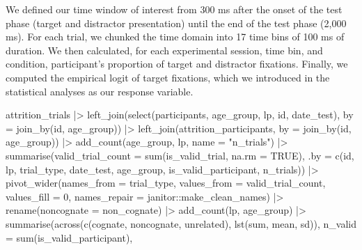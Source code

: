 \documentclass[
  letterpaper,
  DIV=11,
  numbers=noendperiod]{scrartcl}
\newenvironment{Shaded}{\begin{snugshade}}{\end{snugshade}}
\newcommand{\AttributeTok}[1]{\textcolor[rgb]{0.40,0.45,0.13}{#1}}
\newcommand{\ConstantTok}[1]{\textcolor[rgb]{0.56,0.35,0.01}{#1}}
\newcommand{\DecValTok}[1]{\textcolor[rgb]{0.68,0.00,0.00}{#1}}
\newcommand{\FunctionTok}[1]{\textcolor[rgb]{0.28,0.35,0.67}{#1}}
\newcommand{\NormalTok}[1]{\textcolor[rgb]{0.00,0.23,0.31}{#1}}
\newcommand{\SpecialCharTok}[1]{\textcolor[rgb]{0.37,0.37,0.37}{#1}}
\newcommand{\StringTok}[1]{\textcolor[rgb]{0.13,0.47,0.30}{#1}}
\begin{document}
We defined our time window of interest from 300 ms after the onset of
the test phase (target and distractor presentation) until the end of the
test phase (2,000 ms). For each trial, we chunked the time domain into
17 time bins of 100 ms of duration. We then calculated, for each
experimental session, time bin, and condition, participant's proportion
of target and distractor fixations. Finally, we computed the empirical
logit of target fixations, which we introduced in the statistical
analyses as our response variable.

\begin{Shaded}
\begin{Highlighting}[]
\NormalTok{attrition\_trials }\SpecialCharTok{|\textgreater{}} 
    \FunctionTok{left\_join}\NormalTok{(}\FunctionTok{select}\NormalTok{(participants, age\_group, lp, id, date\_test),}
              \AttributeTok{by =} \FunctionTok{join\_by}\NormalTok{(id, age\_group)) }\SpecialCharTok{|\textgreater{}} 
    \FunctionTok{left\_join}\NormalTok{(attrition\_participants,}
              \AttributeTok{by =} \FunctionTok{join\_by}\NormalTok{(id, age\_group)) }\SpecialCharTok{|\textgreater{}} 
    \FunctionTok{add\_count}\NormalTok{(age\_group, lp, }\AttributeTok{name =} \StringTok{"n\_trials"}\NormalTok{) }\SpecialCharTok{|\textgreater{}} 
    \FunctionTok{summarise}\NormalTok{(}\AttributeTok{valid\_trial\_count =} \FunctionTok{sum}\NormalTok{(is\_valid\_trial, }\AttributeTok{na.rm =} \ConstantTok{TRUE}\NormalTok{),}
              \AttributeTok{.by =} \FunctionTok{c}\NormalTok{(id, lp, trial\_type, date\_test,}
\NormalTok{                    age\_group, is\_valid\_participant, n\_trials)) }\SpecialCharTok{|\textgreater{}} 
    \FunctionTok{pivot\_wider}\NormalTok{(}\AttributeTok{names\_from =}\NormalTok{ trial\_type, }
                \AttributeTok{values\_from =}\NormalTok{ valid\_trial\_count, }
                \AttributeTok{values\_fill =} \DecValTok{0}\NormalTok{,}
                \AttributeTok{names\_repair =}\NormalTok{ janitor}\SpecialCharTok{::}\NormalTok{make\_clean\_names) }\SpecialCharTok{|\textgreater{}} 
    \FunctionTok{rename}\NormalTok{(}\AttributeTok{noncognate =}\NormalTok{ non\_cognate) }\SpecialCharTok{|\textgreater{}} 
    \FunctionTok{add\_count}\NormalTok{(lp, age\_group) }\SpecialCharTok{|\textgreater{}}
    \FunctionTok{summarise}\NormalTok{(}\FunctionTok{across}\NormalTok{(}\FunctionTok{c}\NormalTok{(cognate, noncognate, unrelated),}
                     \FunctionTok{lst}\NormalTok{(sum, mean, sd)),}
              \AttributeTok{n\_valid =} \FunctionTok{sum}\NormalTok{(is\_valid\_participant),}

\end{Highlighting}
\end{Shaded}
\end{document}
